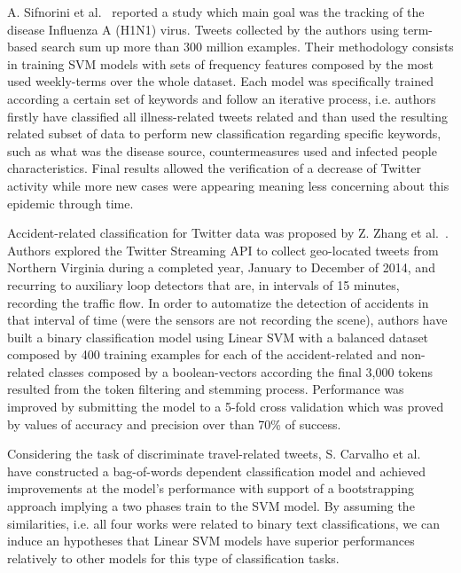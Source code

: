 A. Sifnorini et al.~\cite{signorini2011use} reported a study which main goal was the tracking of the disease Influenza A (H1N1) virus. Tweets collected by the authors using term-based search sum up more than 300 million examples. Their methodology consists in training SVM models with sets of frequency features composed by the most used weekly-terms over the whole dataset. Each model was specifically trained according a certain set of keywords and follow an iterative process, i.e. authors firstly have classified all illness-related tweets related and than used the resulting related subset of data to perform new classification regarding specific keywords, such as what was the disease source, countermeasures used and infected people characteristics. Final results allowed the verification of a decrease of Twitter activity while more new cases were appearing meaning less concerning about this epidemic through time.

Accident-related classification for Twitter data was proposed by Z. Zhang et al.~\cite{zhang2016mining}. Authors explored the Twitter Streaming API to collect geo-located tweets from Northern Virginia during a completed year, January to December of 2014, and recurring to auxiliary loop detectors that are, in intervals of 15 minutes, recording the traffic flow. In order to automatize the detection of accidents in that interval of time (were the sensors are not recording the scene), authors have built a binary classification model using Linear SVM with a balanced dataset composed by 400 training examples for each of the accident-related and non-related classes composed by a boolean-vectors according the final 3,000 tokens resulted from the token filtering and stemming process. Performance was improved by submitting the model to a 5-fold cross validation which was proved by values of accuracy and precision over than 70\% of success.


Considering the task of discriminate travel-related tweets, S. Carvalho et al.~\cite{carvalho2010real} have constructed a bag-of-words dependent classification model and achieved improvements at the model's performance with support of a bootstrapping approach implying a two phases train to the SVM model.  By assuming the similarities, i.e. all four works were related to binary text classifications, we can induce an hypotheses that Linear SVM models have superior performances relatively to other models for this type of classification tasks.

